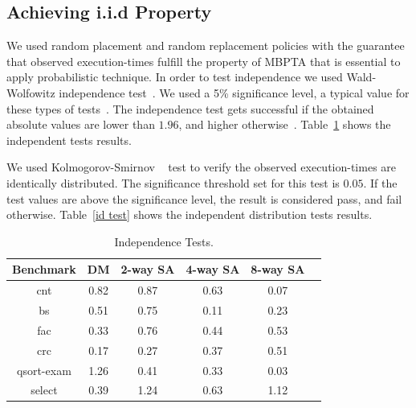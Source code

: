 \subsection{Achieving i.i.d Property}

We used random placement and random replacement policies with the guarantee that observed execution-times fulfill the property of MBPTA that is essential to apply probabilistic technique.  In order to test independence we used Wald-Wolfowitz independence test~\cite{gumbel1954statistical}. We used a 5\% significance level, a typical value for these types of tests~\cite{Kosmidis:2013:CDP:2485288.2485416}. The independence test gets successful if the obtained absolute values are lower than $1.96$, and higher otherwise~\cite{Kosmidis:2013:CDP:2485288.2485416}.
Table~\ref{itest} shows the independent tests results.

 We used Kolmogorov-Smirnov ~\cite{gumbel1954statistical} test to verify the observed execution-times  are identically distributed. The significance threshold set for this test is $0.05$. If the test values are above the significance level, the result is considered pass, and fail otherwise. Table~\ref{id test} shows the independent distribution tests results.





\begin{table}
\center
\caption{Independence Tests.}

\label{itest}



\begin{tabular}{|c | c| c | c| c| c |} 
 \hline
Benchmark & DM & 2-way SA & 4-way SA & 8-way SA  \\ 
\hline

 
 
 cnt & 0.82 & 0.87 & 0.63&  0.07 \\
 \hline
 bs & 0.51 & 0.75 & 0.11& 0.23\\ 
 \hline
 
 fac & 0.33 & 0.76  & 0.44 & 0.53\\
 \hline
 crc & 0.17 & 0.27 & 0.37& 0.51\\
 \hline
 qsort-exam & 1.26  &0.41 & 0.33 & 0.03\\
 \hline
 select & 0.39 &1.24 &0.63 &1.12 \\
 \hline
 
 
\end{tabular}

\end{table}

